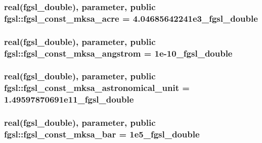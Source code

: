 \subsubsection[{fgsl\+\_\+const\+\_\+mksa\+\_\+acre}]{\setlength{\rightskip}{0pt plus 5cm}real({\bf fgsl\+\_\+double}), parameter, public fgsl\+::fgsl\+\_\+const\+\_\+mksa\+\_\+acre = 4.\+04685642241e3\+\_\+fgsl\+\_\+double}\label{namespacefgsl_a58e85d8e8be547abd415a03ac8cfe6d9}
\hypertarget{namespacefgsl_ae348f6545928612e5e56ed4174d31875}{}
\subsubsection[{fgsl\+\_\+const\+\_\+mksa\+\_\+angstrom}]{\setlength{\rightskip}{0pt plus 5cm}real({\bf fgsl\+\_\+double}), parameter, public fgsl\+::fgsl\+\_\+const\+\_\+mksa\+\_\+angstrom = 1e-\/10\+\_\+fgsl\+\_\+double}\label{namespacefgsl_ae348f6545928612e5e56ed4174d31875}
\hypertarget{namespacefgsl_aa2d41436d179db0d4d442c5207737611}{}
\subsubsection[{fgsl\+\_\+const\+\_\+mksa\+\_\+astronomical\+\_\+unit}]{\setlength{\rightskip}{0pt plus 5cm}real({\bf fgsl\+\_\+double}), parameter, public fgsl\+::fgsl\+\_\+const\+\_\+mksa\+\_\+astronomical\+\_\+unit = 1.\+49597870691e11\+\_\+fgsl\+\_\+double}\label{namespacefgsl_aa2d41436d179db0d4d442c5207737611}
\hypertarget{namespacefgsl_a218481ee71a34d944cbc21affd61bc8a}{}
\subsubsection[{fgsl\+\_\+const\+\_\+mksa\+\_\+bar}]{\setlength{\rightskip}{0pt plus 5cm}real({\bf fgsl\+\_\+double}), parameter, public fgsl\+::fgsl\+\_\+const\+\_\+mksa\+\_\+bar = 1e5\+\_\+fgsl\+\_\+double}\label{namespacefgsl_a218481ee71a34d944cbc21affd61bc8a}
\hypertarget{namespacefgsl_a859c8ea83a5175d31bc4240282c2b0b4}{}
